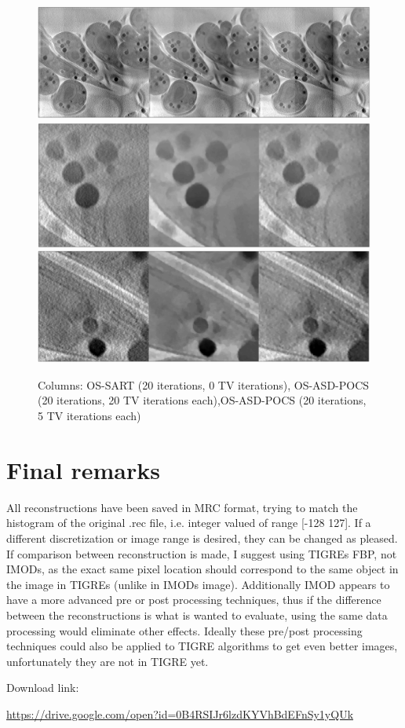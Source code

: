 \documentclass[11pt]{report}
\begin{document}
\begin{figure}
\begin{center}

\includegraphics[width=\textwidth]{OSSART_0_20_5_TViters.png} 
\includegraphics[width=\textwidth]{OSSART_0_20_5_TVitersz1.png} 
\includegraphics[width=\textwidth]{OSSART_0_20_5_TVitersz2.png} 

\end{center}

\caption{\label{fig:OStv}Columns: OS-SART (20 iterations, 0 TV iterations), OS-ASD-POCS (20 iterations, 20 TV iterations each),OS-ASD-POCS (20 iterations, 5 TV iterations each)} 
\end{figure}


\chapter*{Final remarks}

All reconstructions have been saved in MRC format, trying to match the histogram of the original .rec file, i.e. integer valued of range [-128 127]. If a different discretization or image range is desired, they can be changed as pleased. If comparison between reconstruction is made, I suggest using TIGREs FBP, not IMODs, as the exact same pixel location should correspond to the same object in the image in TIGREs (unlike in IMODs image). Additionally IMOD appears to have a more advanced pre or post processing techniques, thus if the difference between the reconstructions is what is wanted to evaluate, using the same data processing would eliminate other effects. Ideally these pre/post processing techniques could also be applied to TIGRE algorithms to get even better images, unfortunately they are not in TIGRE yet. 

Download link:

 \href{}{https://drive.google.com/open?id=0B4RSIJr6lzdKYVhBdEFnSy1yQUk}
\end{document}

